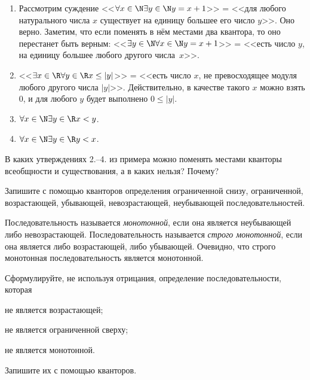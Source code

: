 \documentclass[a4paper, 12pt, num=2426, date=01.09.2020]{listok}
\begin{document}
\begin{example*}
\begin{enumerate}
    \item Рассмотрим суждение <<$\forall{x \in \N} \exists{y \in \N} y = x + 1$>> = <<для любого натурального числа $x$ существует на единицу большее его число $y$>>.
    Оно верно. Заметим, что если поменять в нём местами два квантора, то оно перестанет быть верным:
    \mbox{<<$\exists{y \in \N} \forall{x \in \N} y = x + 1$>>} = <<есть число $y$, на единицу большее любого другого числа~$x$>>.
    \item <<$\exists{x \in \R} \forall{y \in \R} x \le |y|$>> = <<есть число $x$, не превосходящее модуля любого другого числа $|y|$>>. Действительно, в качестве такого $x$ можно взять $0$, и для любого $y$ будет выполнено $0 \le |y|$.
    \item $\forall{x \in \N} \exists{y \in \R} x < y$.
    \item $\forall{x \in \N} \exists{y \in \R} y < x$.
\end{enumerate}
\end{example*}

\begin{problem}
    В каких утверждениях 2.--4. из примера можно поменять местами кванторы всеобщности и существования, а в каких нельзя? Почему?
\end{problem}

\begin{problem}
    Запишите с помощью кванторов определения ограниченной снизу, ограниченной, возрастающей, убывающей, невозрастающей, неубывающей последовательностей.
\end{problem}

\begin{definition}
    Последовательность называется \textit{монотонной}, если она является неубывающей либо невозрастающей.
    Последовательность называется \textit{строго монотонной}, если она является либо возрастающей, либо убывающей.
    Очевидно, что строго монотонная последовательность является монотонной.
\end{definition}

\begin{problem}
    Сформулируйте, не используя отрицания, определение последовательности, которая
    \begin{probparts}
        \item не является возрастающей;
        \item не является ограниченной сверху;
        \item не является монотонной.
    \end{probparts}
    Запишите их с помощью кванторов.
\end{problem}
\end{document}
